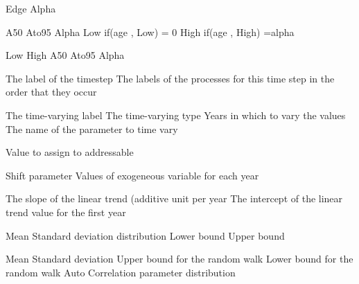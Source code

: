  {Edge}
 {Alpha}
\par\textbf{}\par
{} {A50}
 {Ato95}
 {Alpha}
 {Low if(age , Low) = 0}
 {High if(age , High) =alpha}
\par\textbf{}\par
{} {Low}
 {High}
 {A50}
 {Ato95}
 {Alpha}
\par\par
{} {The label of the timestep}
 {The labels of the processes for this time step in the order that they occur}
\par\par
{} {The time-varying label}
 {The time-varying type}
 {Years in which to vary the values}
 {The name of the parameter to time vary}
\par\textbf{}\par
{} {}
 {}
 {}
 {}
 {}
\par\textbf{}\par
{} {Value to assign to addressable}
\par\textbf{}\par
{} {Shift parameter}
 {Values of exogeneous variable for each year}
\par\textbf{}\par
{} {The slope of the linear trend (additive unit per year}
 {The intercept of the linear trend value for the first year}
\par\textbf{}\par
{} {Mean}
 {Standard deviation}
 {distribution}
 {Lower bound}
 {Upper bound}
\par\textbf{}\par
{} {Mean}
 {Standard deviation}
 {Upper bound for the random walk}
 {Lower bound for the random walk}
 {Auto Correlation parameter}
 {distribution}
